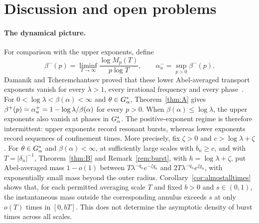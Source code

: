 \section{Discussion and open problems}\label{sec:discussion}

\paragraph{The dynamical picture.}
For comparison with the upper exponents, define
\[
\beta^-(p)=\liminf_{T\to\infty}\frac{\log M_p(T)}{p\log T},
\qquad \alpha_u^-=\sup_{p>0}\beta^-(p).
\]
Damanik and Tcheremchantsev proved that these lower Abel-averaged transport exponents vanish for every $\lambda>1$, every irrational frequency and every phase~\cite[Theorem~4]{DT2007}. For $0<\log\lambda<\beta(\alpha)<\infty$ and $\theta\in G_\alpha^*$, Theorem~\ref{thm:A} gives $\beta^+(p)=\alpha_u^+=1-\log\lambda/\beta(\alpha)$ for every $p>0$. When $\beta(\alpha)\le\log\lambda$, the upper exponents also vanish at phases in $G_\alpha^*$. The positive-exponent regime is therefore intermittent: upper exponents record resonant bursts, whereas lower exponents record sequences of confinement times. More precisely, fix $\zeta>0$ and $c>\log\lambda+\zeta$. For $\theta\in G_\alpha^*$ and $\beta(\alpha)<\infty$, at sufficiently large scales with $b_n\ge c$, and with $T=|\delta_n|^{-1}$, Theorem~\ref{thm:B} and Remark~\ref{rem:burst}, with $h=\log\lambda+\zeta$, put Abel-averaged mass $1-o(1)$ between $T\lambda^{-q_n}e^{-\zeta q_n}$ and $2T\lambda^{-q_n}e^{\zeta q_n}$, with exponentially small mass beyond the outer radius. Corollary~\ref{cor:almostalltimes} shows that, for each permitted averaging scale $T$ and fixed $b>0$ and $s\in(0,1)$, the instantaneous mass outside the corresponding annulus exceeds $s$ at only $o(T)$ times in $[0,bT]$. This does not determine the asymptotic density of burst times across all scales.

